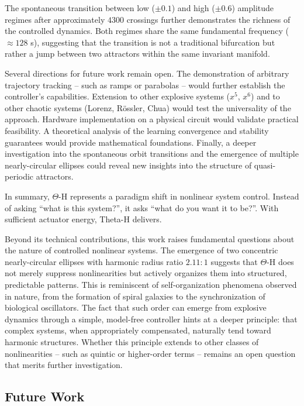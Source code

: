 \documentclass[twocolumn]{article}
\begin{document}
The spontaneous transition between low ($\pm 0.1$) and high ($\pm 0.6$) 
amplitude regimes after approximately $4300$ crossings further 
demonstrates the richness of the controlled dynamics. Both regimes 
share the same fundamental frequency ($\approx 128$ s), suggesting 
that the transition is not a traditional bifurcation but rather a 
jump between two attractors within the same invariant manifold.

Several directions for future work remain open. The demonstration 
of arbitrary trajectory tracking -- such as ramps or parabolas -- would 
further establish the controller's capabilities. Extension to other 
explosive systems ($x^5$, $x^6$) and to other chaotic systems 
(Lorenz, R\"ossler, Chua) would test the universality of the approach. 
Hardware implementation on a physical circuit would validate practical 
feasibility. A theoretical analysis of the learning convergence and 
stability guarantees would provide mathematical foundations. Finally, 
a deeper investigation into the spontaneous orbit transitions and the 
emergence of multiple nearly-circular ellipses could reveal new 
insights into the structure of quasi-periodic attractors.

In summary, $\Theta$-H represents a paradigm shift in nonlinear system 
control. Instead of asking ``what is this system?'', it asks 
``what do you want it to be?''. With sufficient actuator energy, 
Theta-H delivers.

Beyond its technical contributions, this work raises fundamental 
questions about the nature of controlled nonlinear systems. The emergence
 of two concentric nearly-circular ellipses with harmonic radius ratio 
 \mbox{$2.11:1$} suggests that $\Theta$-H does not merely suppress 
 nonlinearities but actively organizes them into structured, predictable 
 patterns. This is reminiscent of self-organization phenomena observed in nature, 
 from the formation of spiral galaxies to the synchronization of biological 
 oscillators. The fact that such order can emerge from explosive dynamics 
 through a simple, model-free controller hints at a deeper principle: that 
 complex systems, when appropriately compensated, naturally tend toward 
 harmonic structures. Whether this principle extends to other classes 
 of nonlinearities -- such as quintic or higher-order terms -- remains 
 an open question that merits further investigation.

\subsection{Future Work}
\end{document}
